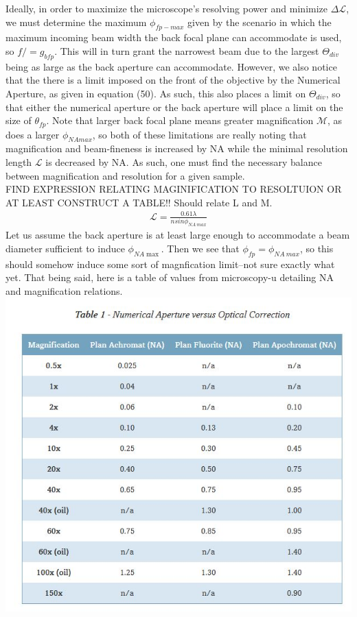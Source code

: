 Ideally, in order to maximize the microscope's resolving power and minimize $\Delta \mathcal{L}$, we must determine the maximum $\phi_{fp-max}$ given by the scenario in which the maximum incoming beam width the back focal plane can accommodate is used, so $f/=g_{bfp}$. This will in turn grant the narrowest beam due to the largest $\Theta_{div}$ being as large as the back aperture can accommodate. However, we also notice that the there is a limit imposed on the front of the objective by the Numerical Aperture, as given in equation (50). As such, this also places a limit on $\Theta_{div}$, so that either the numerical aperture or the back aperture will place a limit on the size of $\theta_{fp}$. Note that larger back focal plane means greater magnification $\mathcal{M}$, as does a larger $\phi_{NA max}$, so both of these limitations are really noting that magnification and beam-fineness is increased by NA while the minimal resolution length $\mathcal{L}$ is decreased by NA. As such, one must find the necessary balance between magnification and resolution for a given sample.\\
FIND EXPRESSION RELATING MAGINIFICATION TO RESOLTUION OR AT LEAST CONSTRUCT A TABLE!! Should relate L and M.
\begin{gather}
    \mathcal{L} = \frac{0.61\lambda }{nsin\phi_{NA \ max}}
\end{gather}
Let us assume the back aperture is at least large enough to accommodate a beam diameter sufficient to induce $\phi_{NA \max}$. Then we see that $\phi_{fp} = \phi_{NA \ max}$, so this should somehow induce some sort of magnfication limit--not sure exactly what yet. 
That being said, here is a table of values from microscopy-u detailing NA and magnification relations.\\
\includegraphics[width=\textwidth]{num_aperture_magnification_table.JPG}
